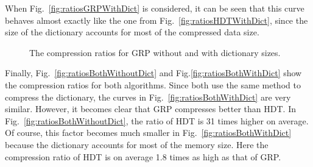 When Fig.~\ref{fig:ratiosGRPWithDict} is considered, it can be seen that this curve behaves almost exactly like the one from Fig.~\ref{fig:ratiosHDTWithDict}, since the size of the dictionary accounts for most of the compressed data size.

\begin{figure}[h]
	\centering
	\hfill
	\caption{The compression ratios for GRP without and with dictionary sizes.}
\end{figure}

Finally, Fig.~\ref{fig:ratiosBothWithoutDict} and Fig.\ref{fig:ratiosBothWithDict} show the compression ratios for both algorithms. Since both use the same method to compress the dictionary, the curves in Fig.~\ref{fig:ratiosBothWithDict} are very similar. However, it becomes clear that GRP compresses better than HDT. In Fig.~\ref{fig:ratiosBothWithoutDict}, the ratio of HDT is 31 times higher on average. Of course, this factor becomes much smaller in Fig.~\ref{fig:ratiosBothWithDict} because the dictionary accounts for most of the memory size. Here the compression ratio of HDT is on average 1.8 times as high as that of GRP.

